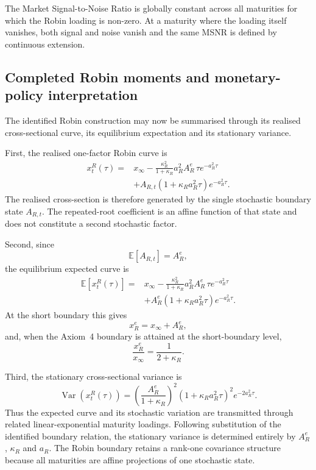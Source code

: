 \documentclass[12pt]{article}
\numberwithin{equation}{subsection}
\newcommand{\E}{\mathbb{E}}
\newcommand{\Var}{\operatorname{Var}}
\begin{document}
The Market Signal-to-Noise Ratio is globally constant across all maturities for which the Robin loading is non-zero. At a maturity where the loading itself vanishes, both signal and noise vanish and the same MSNR is defined by continuous extension.

\subsection{Completed Robin moments and monetary-policy interpretation}

The identified Robin construction may now be summarised through its realised cross-sectional curve, its equilibrium expectation and its stationary variance.

First, the realised one-factor Robin curve is
\begin{equation}
\boxed{
\begin{aligned}
x^R_t(\tau)
={}&x_\infty
-\frac{\kappa_R^2}{1+\kappa_R}
a_R^2A_R^e\,\tau e^{-a_R^2\tau}
\\
&+
A_{R,t}
\left(1+\kappa_Ra_R^2\tau\right)
e^{-a_R^2\tau}.
\end{aligned}}
\end{equation}
The realised cross-section is therefore generated by the single stochastic boundary state $A_{R,t}$. The repeated-root coefficient is an affine function of that state and does not constitute a second stochastic factor.

Second, since
\begin{equation}
\E[A_{R,t}]=A_R^e,
\end{equation}
the equilibrium expected curve is
\begin{equation}
\boxed{
\begin{aligned}
\E\!\left[x^R_t(\tau)\right]
={}&x_\infty
-\frac{\kappa_R^2}{1+\kappa_R}
a_R^2A_R^e\,\tau e^{-a_R^2\tau}
\\
&+
A_R^e
\left(1+\kappa_Ra_R^2\tau\right)
e^{-a_R^2\tau}.
\end{aligned}}
\end{equation}
At the short boundary this gives
\begin{equation}
x_R^e=x_\infty+A_R^e,
\end{equation}
and, when the Axiom~4 boundary is attained at the short-boundary level,
\begin{equation}
\frac{x_R^e}{x_\infty}
=
\frac{1}{2+\kappa_R}.
\end{equation}

Third, the stationary cross-sectional variance is
\begin{equation}
\boxed{
\Var\!\left(x^R_t(\tau)\right)
=
\left(\frac{A_R^e}{1+\kappa_R}\right)^2
\left(1+\kappa_Ra_R^2\tau\right)^2
e^{-2a_R^2\tau}.}
\end{equation}
Thus the expected curve and its stochastic variation are transmitted through related linear-exponential maturity loadings. Following substitution of the identified boundary relation, the stationary variance is determined entirely by $A_R^e$, $\kappa_R$ and $a_R$. The Robin boundary retains a rank-one covariance structure because all maturities are affine projections of one stochastic state.
\end{document}

